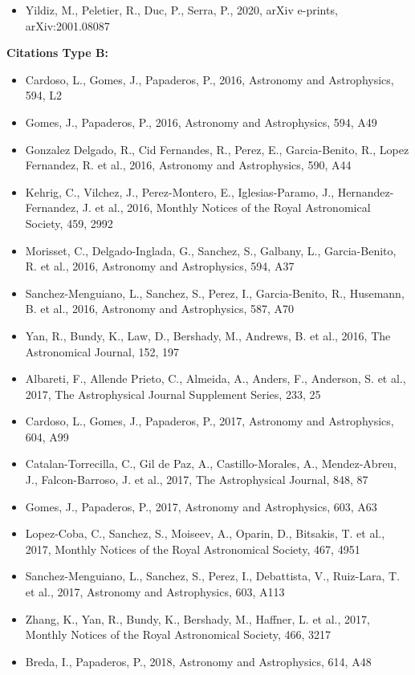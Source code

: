 \documentclass{letter}
\begin{document}
\begin{enumerate}
\begin{itemize}
\item Yildiz, M., Peletier, R., Duc, P., Serra, P., 2020, arXiv e-prints, arXiv:2001.08087
\end{itemize}
{\bf Citations Type B:}
\begin{itemize}
\item Cardoso, L., Gomes, J., Papaderos, P., 2016, Astronomy and Astrophysics, 594, L2
\item Gomes, J., Papaderos, P., 2016, Astronomy and Astrophysics, 594, A49
\item Gonzalez Delgado, R., Cid Fernandes, R., Perez, E., Garcia-Benito, R., Lopez Fernandez, R. et al., 2016, Astronomy and Astrophysics, 590, A44
\item Kehrig, C., Vilchez, J., Perez-Montero, E., Iglesias-Paramo, J., Hernandez-Fernandez, J. et al., 2016, Monthly Notices of the Royal Astronomical Society, 459, 2992
\item Morisset, C., Delgado-Inglada, G., Sanchez, S., Galbany, L., Garcia-Benito, R. et al., 2016, Astronomy and Astrophysics, 594, A37
\item Sanchez-Menguiano, L., Sanchez, S., Perez, I., Garcia-Benito, R., Husemann, B. et al., 2016, Astronomy and Astrophysics, 587, A70
\item Yan, R., Bundy, K., Law, D., Bershady, M., Andrews, B. et al., 2016, The Astronomical Journal, 152, 197
\item Albareti, F., Allende Prieto, C., Almeida, A., Anders, F., Anderson, S. et al., 2017, The Astrophysical Journal Supplement Series, 233, 25
\item Cardoso, L., Gomes, J., Papaderos, P., 2017, Astronomy and Astrophysics, 604, A99
\item Catalan-Torrecilla, C., Gil de Paz, A., Castillo-Morales, A., Mendez-Abreu, J., Falcon-Barroso, J. et al., 2017, The Astrophysical Journal, 848, 87
\item Gomes, J., Papaderos, P., 2017, Astronomy and Astrophysics, 603, A63
\item Lopez-Coba, C., Sanchez, S., Moiseev, A., Oparin, D., Bitsakis, T. et al., 2017, Monthly Notices of the Royal Astronomical Society, 467, 4951
\item Sanchez-Menguiano, L., Sanchez, S., Perez, I., Debattista, V., Ruiz-Lara, T. et al., 2017, Astronomy and Astrophysics, 603, A113
\item Zhang, K., Yan, R., Bundy, K., Bershady, M., Haffner, L. et al., 2017, Monthly Notices of the Royal Astronomical Society, 466, 3217
\item Breda, I., Papaderos, P., 2018, Astronomy and Astrophysics, 614, A48

\end{itemize}
\end{enumerate}
\end{document}
